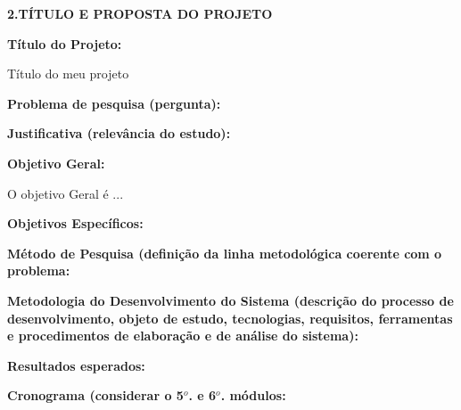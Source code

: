 \documentclass[
	hidelinks,
	12pt,				%
	openright,			%
	oneside,			%
	a4paper,			%
	english,			%
	french,				%
	spanish,			%
	brazil,				%
]{abntex2}
\begin{document}
\begin{flushleft}
   \normalsize\textbf{2.TÍTULO E PROPOSTA DO PROJETO}
\end{flushleft}

\begin{flushleft}
   \small \textbf{Título do Projeto:}
\end{flushleft} 
\normalsize
Título do meu projeto\\

\begin{flushleft}
\textbf{Problema de pesquisa (pergunta):}
\end{flushleft} 


\begin{flushleft}
\textbf{Justificativa (relevância do estudo):}
\end{flushleft} 


\begin{flushleft}
\textbf{Objetivo Geral:}
\end{flushleft} 


\justify

\hspace{0.5cm} O objetivo Geral é ...

\begin{flushleft}
\textbf{Objetivos Específicos:}
\end{flushleft} 


\begin{justify}
\textbf{Método de Pesquisa (definição da linha metodológica coerente com o problema:}
\end{justify} 


\begin{justify}
\textbf{Metodologia do Desenvolvimento do Sistema (descrição do processo de desenvolvimento, objeto de estudo, tecnologias, requisitos, ferramentas e procedimentos de elaboração e de análise do sistema):}
\end{justify} 


\begin{flushleft}
\textbf{Resultados esperados:}
\end{flushleft} 


\begin{flushleft}
\textbf{Cronograma (considerar o 5$^o$. e 6$^o$. módulos:}
\end{flushleft} 

\end{document}
